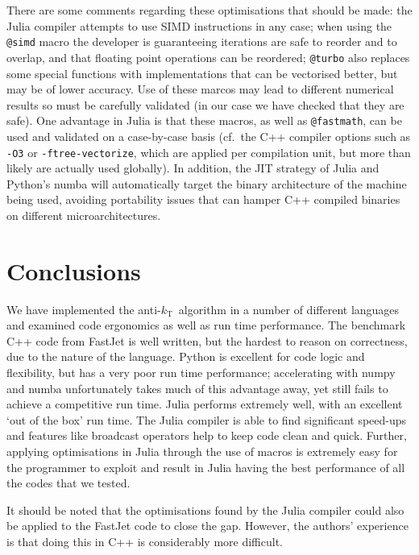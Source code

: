\documentclass{webofc}
\newcommand{\akt}{anti-${k}_\text{T}$}
\begin{document}
There are some comments regarding these optimisations that should be made: the
Julia compiler attempts to use SIMD instructions in any case; when using the
\texttt{@simd} macro the developer is guaranteeing iterations are safe to
reorder and to overlap, and that floating point operations can be reordered;
\texttt{@turbo} also replaces some special functions with implementations that
can be vectorised better, but may be of lower accuracy. Use of these marcos may
lead to different numerical results so must be carefully validated (in our case
we have checked that they are safe). One advantage in Julia is that these
macros, as well as \texttt{@fastmath}, can be used and validated on a
case-by-case basis (cf.\ the C++ compiler options such as \texttt{-O3} or
\texttt{-ftree-vectorize}, which are applied per compilation unit, but more than
likely are actually used globally). In addition, the JIT strategy of Julia and
Python's numba will automatically target the binary architecture of the machine
being used, avoiding portability issues that can hamper C++ compiled binaries on
different microarchitectures.

\section{Conclusions}
\label{sec:conclusions}

We have implemented the \akt\ algorithm in a number of different languages
and examined code ergonomics as well as run time performance. The benchmark C++
code from FastJet is well written, but the hardest to reason on correctness, due
to the nature of the language. Python is excellent for code logic and
flexibility, but has a very poor run time performance; accelerating with numpy
and numba unfortunately takes much of this advantage away, yet still fails to
achieve a competitive run time. Julia performs extremely well, with an excellent
`out of the box' run time. The Julia compiler is able to find significant
speed-ups and features like broadcast operators help to keep code clean and
quick. Further, applying optimisations in Julia through the use of macros is
extremely easy for the programmer to exploit and result in Julia having the best
performance of all the codes that we tested.

It should be noted that the optimisations found by the Julia compiler could also
be applied to the FastJet code to close the gap. However, the authors'
experience is that doing this in C++ is considerably more difficult.
\end{document}
